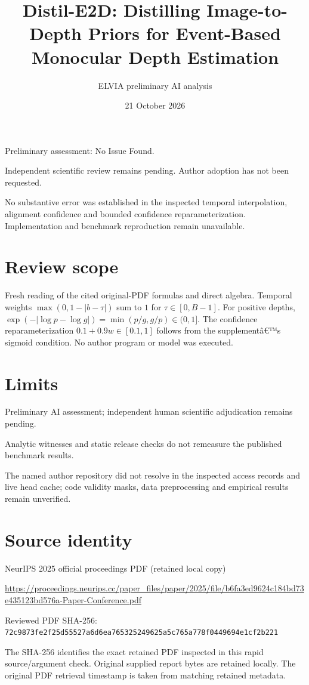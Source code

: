 \documentclass[11pt]{article}
\begin{document}
\title{Distil-E2D: Distilling Image-to-Depth Priors for Event-Based Monocular Depth Estimation}

\author{ELVIA preliminary AI analysis}\date{21 October 2026}\maketitle

Preliminary assessment: No Issue Found.\par

Independent scientific review remains pending. Author adoption has not been requested.

No substantive error was established in the inspected temporal interpolation, alignment confidence and bounded confidence reparameterization. Implementation and benchmark reproduction remain unavailable.

\section*{Review scope}

Fresh reading of the cited original-PDF formulas and direct algebra. Temporal weights \(\max(0,1-|b-\tau|)\) sum to \(1\) for \(\tau\in[0,B-1]\). For positive depths, \(\exp(-|\log p-\log g|)=\min(p/g,g/p)\in(0,1]\). The confidence reparameterization \(0.1+0.9w\in[0.1,1]\) follows from the supplementâ€™s sigmoid condition. No author program or model was executed.

\section*{Limits}

Preliminary AI assessment; independent human scientific adjudication remains pending.\par

Analytic witnesses and static release checks do not remeasure the published benchmark results.\par

The named author repository did not resolve in the inspected access records and live head cache; code validity masks, data preprocessing and empirical results remain unverified.\par

\section*{Source identity}

NeurIPS 2025 official proceedings PDF (retained local copy)

\url{https://proceedings.neurips.cc/paper_files/paper/2025/file/b6fa3ed9624c184bd73e435123bd576a-Paper-Conference.pdf}

Reviewed PDF SHA-256: \nolinkurl{72c9873fe2f25d55527a6d6ea765325249625a5c765a778f0449694e1cf2b221}

The SHA-256 identifies the exact retained PDF inspected in this rapid source/argument check. Original supplied report bytes are retained locally. The original PDF retrieval timestamp is taken from matching retained metadata.
\end{document}

